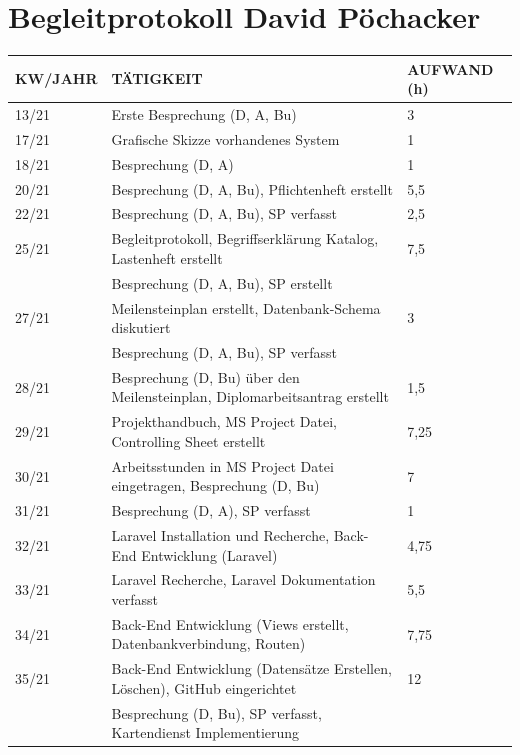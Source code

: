\section{Begleitprotokoll David Pöchacker}
\begin{table}[h]
	\begin{tabular}{|l|l|l|}
		\hline
		\textbf{KW/JAHR} &     \textbf{TÄTIGKEIT}  & 	\textbf{AUFWAND (h)}    \\ \hline
		
13/21   & Erste Besprechung (D, A, Bu) & 3 	\\ \hline
17/21   & Grafische Skizze vorhandenes System  & 1 	\\ \hline
18/21   & Besprechung (D, A)  & 1 	\\ \hline
20/21   & Besprechung (D, A, Bu), Pflichtenheft erstellt & 5,5 	\\ \hline
22/21   & Besprechung (D, A, Bu), SP verfasst & 2,5 	\\ \hline
25/21   & Begleitprotokoll, Begriffserklärung Katalog, Lastenheft erstellt & 7,5   \\
		& Besprechung (D, A, Bu), SP erstellt & \\ \hline	
27/21   & Meilensteinplan erstellt, Datenbank-Schema diskutiert  & 3 \\
		& Besprechung (D, A, Bu), SP verfasst & 	\\ \hline		
28/21   & Besprechung (D, Bu) über den Meilensteinplan, Diplomarbeitsantrag erstellt  & 1,5 \\ \hline		
29/21   & Projekthandbuch, MS Project Datei, Controlling Sheet erstellt & 7,25 	\\ \hline
30/21   & Arbeitsstunden in MS Project Datei eingetragen, Besprechung (D, Bu) & 7 	\\ \hline
31/21   & Besprechung (D, A), SP verfasst  & 1	\\ \hline
32/21   & Laravel Installation und Recherche, Back-End Entwicklung (Laravel) & 4,75	\\ \hline
33/21   & Laravel Recherche, Laravel Dokumentation verfasst & 5,5	\\ \hline
34/21   & Back-End Entwicklung (Views erstellt, Datenbankverbindung, Routen) & 7,75	\\ \hline
35/21   & Back-End Entwicklung (Datensätze Erstellen, Löschen), GitHub eingerichtet  & 12 \\ 
        & Besprechung (D, Bu), SP verfasst, Kartendienst Implementierung  &	\\ \hline
	\end{tabular}
\end{table}

